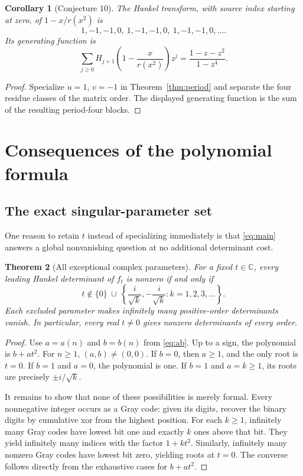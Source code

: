 \documentclass[11pt,a4paper]{article}
\numberwithin{equation}{section}
\newtheorem{theorem}{Theorem}[section]
\newtheorem{corollary}[theorem]{Corollary}
\theoremstyle{definition}
\theoremstyle{remark}
\newcommand{\C}{\mathbb C}
\begin{document}
\begin{corollary}[Conjecture 10]\label{cor:c10}
The Hankel transform, with source index starting at zero, of
$1-x/r(x^2)$ is
\[
 1,-1,-1,0,\ 1,-1,-1,0,\ 1,-1,-1,0,\ldots.
\]
Its generating function is
\begin{equation}\label{eq:periodgf}
 \sum_{j\ge0}H_{j+1}\!\left(1-\frac{x}{r(x^2)}\right)z^j
 =\frac{1-z-z^2}{1-z^4}.
\end{equation}
\end{corollary}
\begin{proof}
Specialize $u=1$, $v=-1$ in Theorem~\ref{thm:period} and separate the
four residue classes of the matrix order. The displayed generating
function is the sum of the resulting period-four blocks.
\end{proof}

\section{Consequences of the polynomial formula}\label{sec:consequences}

\subsection{The exact singular-parameter set}

One reason to retain $t$ instead of specializing immediately is that
\eqref{eq:main} answers a global nonvanishing question at no additional
determinant cost.

\begin{theorem}[All exceptional complex parameters]\label{thm:zeros}
For a fixed $t\in\C$, every leading Hankel determinant of $f_t$ is
nonzero if and only if
\begin{equation}\label{eq:exceptions}
 t\notin\{0\}\ \cup\ 
 \left\{\frac{i}{\sqrt{k}},-\frac{i}{\sqrt{k}}:k=1,2,3,\ldots\right\}.
\end{equation}
Each excluded parameter makes infinitely many positive-order
determinants vanish. In particular, every real $t\ne0$ gives nonzero
determinants of every order.
\end{theorem}
\begin{proof}
Use $a=a(n)$ and $b=b(n)$ from \eqref{eq:ab}. Up to a sign, the
polynomial is $b+a t^2$. For $n\ge1$, $(a,b)\ne(0,0)$.
If $b=0$, then $a\ge1$, and the only root is $t=0$.
If $b=1$ and $a=0$, the polynomial is one. If $b=1$ and $a=k\ge1$,
its roots are precisely $\pm i/\sqrt{k}$.

It remains to show that none of these possibilities is merely formal.
Every nonnegative integer occurs as a Gray code: given its digits,
recover the binary digits by cumulative xor from the highest position.
For each $k\ge1$, infinitely many Gray codes have lowest bit one and
exactly $k$ ones above that bit. They yield infinitely many indices
with the factor $1+k t^2$. Similarly, infinitely many nonzero Gray
codes have lowest bit zero, yielding roots at $t=0$. The converse
follows directly from the exhaustive cases for $b+a t^2$.
\end{proof}
\end{document}
